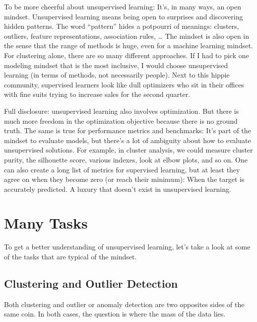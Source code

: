 \documentclass[
  10pt,
]{scrbook}
\begin{document}
To be more cheerful about unsupervised learning:
It's, in many ways, an open mindset.
Unsupervised learning means being open to surprises and discovering hidden patterns.
The word ``pattern'' hides a potpourri of meanings: clusters, outliers, feature representations, association rules, \ldots{}
The mindset is also open in the sense that the range of methods is huge, even for a machine learning mindset.
For clustering alone, there are so many different approaches.
If I had to pick one modeling mindset that is the most inclusive, I would choose unsupervised learning (in terms of methods, not necessarily people).
Next to this hippie community, supervised learners look like dull optimizers who sit in their offices with fine suits trying to increase sales for the second quarter.

Full disclosure: unsupervised learning also involves optimization.
But there is much more freedom in the optimization objective because there is no ground truth.
The same is true for performance metrics and benchmarks:
It's part of the mindset to evaluate models, but there's a lot of ambiguity about how to evaluate unsupervised solutions.
For example, in cluster analysis, we could measure cluster purity, the silhouette score, various indexes, look at elbow plots, and so on.
One can also create a long list of metrics for supervised learning, but at least they agree on when they become zero (or reach their minimum):
When the target is accurately predicted.
A luxury that doesn't exist in unsupervised learning.

\hypertarget{many-tasks}{%
\section{Many Tasks}\label{many-tasks}}

To get a better understanding of unsupervised learning, let's take a look at some of the tasks that are typical of the mindset.

\hypertarget{clustering-and-outlier-detection}{%
\subsection{Clustering and Outlier Detection}\label{clustering-and-outlier-detection}}

Both clustering and outlier or anomaly detection are two opposites sides of the same coin.
In both cases, the question is where the mass of the data lies.
\end{document}
